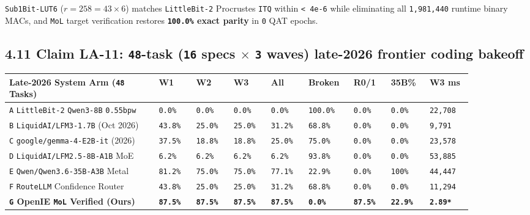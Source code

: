 \documentclass[10pt]{article}
\begin{document}
\texttt{Sub1Bit-LUT6} ($r=258=43\times 6$) matches \texttt{LittleBit-2} Procrustes \texttt{ITQ} within \texttt{< 4e-6} while eliminating all \texttt{1,981,440} runtime binary MACs, and \texttt{MoL} target verification restores \textbf{\texttt{100.0\%} exact parity} in \texttt{0} QAT epochs.

\subsection{4.11 Claim LA-11: \texttt{48}-task (\texttt{16} specs \texorpdfstring{$\times$}{x} \texttt{3} waves) late-2026 frontier coding bakeoff}\label{claim-la11}

{\footnotesize\setlength{\tabcolsep}{2.2pt}
\begin{longtable}{@{}L{0.28\linewidth}C{0.072\linewidth}C{0.072\linewidth}C{0.072\linewidth}C{0.072\linewidth}C{0.085\linewidth}C{0.072\linewidth}C{0.072\linewidth}C{0.082\linewidth}@{}}
\toprule
\textbf{Late-2026 System Arm (\texttt{48} Tasks)} & \textbf{W1} & \textbf{W2} & \textbf{W3} & \textbf{All} & \textbf{Broken} & \textbf{R0/1} & \textbf{35B\%} & \textbf{W3 ms} \\
\midrule
\endhead
\texttt{A} \texttt{LittleBit-2} \texttt{Qwen3-8B} \texttt{0.55bpw} & \texttt{0.0\%} & \texttt{0.0\%} & \texttt{0.0\%} & \texttt{0.0\%} & \texttt{100.0\%} & \texttt{0.0\%} & \texttt{0.0\%} & \texttt{22,708} \\
\texttt{B} \texttt{LiquidAI/LFM3-1.7B} (Oct 2026) & \texttt{43.8\%} & \texttt{25.0\%} & \texttt{25.0\%} & \texttt{31.2\%} & \texttt{68.8\%} & \texttt{0.0\%} & \texttt{0.0\%} & \texttt{9,791} \\
\texttt{C} \texttt{google/gemma-4-E2B-it} (2026) & \texttt{37.5\%} & \texttt{18.8\%} & \texttt{18.8\%} & \texttt{25.0\%} & \texttt{75.0\%} & \texttt{0.0\%} & \texttt{0.0\%} & \texttt{23,578} \\
\texttt{D} \texttt{LiquidAI/LFM2.5-8B-A1B} MoE & \texttt{6.2\%} & \texttt{6.2\%} & \texttt{6.2\%} & \texttt{6.2\%} & \texttt{93.8\%} & \texttt{0.0\%} & \texttt{0.0\%} & \texttt{53,885} \\
\texttt{E} \texttt{Qwen/Qwen3.6-35B-A3B} Metal & \texttt{81.2\%} & \texttt{75.0\%} & \texttt{75.0\%} & \texttt{77.1\%} & \texttt{22.9\%} & \texttt{0.0\%} & \texttt{100\%} & \texttt{44,447} \\
\texttt{F} \texttt{RouteLLM} Confidence Router & \texttt{43.8\%} & \texttt{25.0\%} & \texttt{25.0\%} & \texttt{31.2\%} & \texttt{68.8\%} & \texttt{0.0\%} & \texttt{0.0\%} & \texttt{11,294} \\
\textbf{\texttt{G} OpenIE \texttt{MoL} Verified (Ours)} & \textbf{\texttt{87.5\%}} & \textbf{\texttt{87.5\%}} & \textbf{\texttt{87.5\%}} & \textbf{\texttt{87.5\%}} & \textbf{\texttt{0.0\%}} & \textbf{\texttt{87.5\%}} & \textbf{\texttt{22.9\%}} & \textbf{\texttt{2.89*}} \\
\bottomrule
\end{longtable}
}
\end{document}
